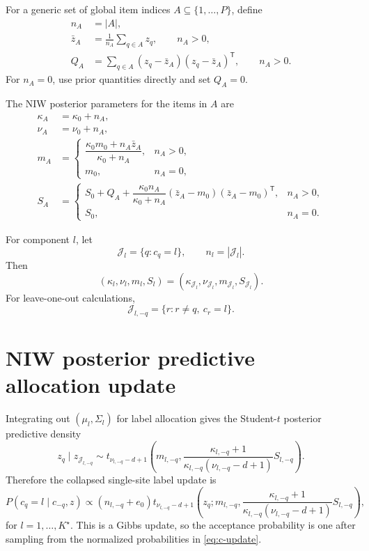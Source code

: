 \documentclass[11pt]{article}
\newcommand{\trans}{^{\mathsf T}}
\begin{document}
For a generic set of global item indices $A\subseteq\{1,\dots,P\}$, define
\begin{align}
    n_A &= |A|,\\
    \bar z_A &= \frac{1}{n_A}\sum_{q\in A}z_q,
    \qquad n_A>0,\\
    Q_A &= \sum_{q\in A}(z_q-\bar z_A)(z_q-\bar z_A)\trans,
    \qquad n_A>0.
\end{align}
For $n_A=0$, use prior quantities directly and set $Q_A=0$.

The NIW posterior parameters for the items in $A$ are
\begin{align}
    \kappa_A &= \kappa_0+n_A,\\
    \nu_A &= \nu_0+n_A,\\
    m_A &=
    \begin{cases}
    \dfrac{\kappa_0m_0+n_A\bar z_A}{\kappa_0+n_A}, & n_A>0,\\[1em]
    m_0, & n_A=0,
    \end{cases}\\
    S_A &=
    \begin{cases}
    S_0+Q_A+
    \dfrac{\kappa_0 n_A}{\kappa_0+n_A}
    (\bar z_A-m_0)(\bar z_A-m_0)\trans,
    & n_A>0,\\[1em]
    S_0, & n_A=0.
    \end{cases}
    \label{eq:niw-posterior-params}
\end{align}

For component $l$, let
\[
    \mathcal J_l=\{q:c_q=l\},
    \qquad n_l=|\mathcal J_l|.
\]
Then
\[
    (\kappa_l,\nu_l,m_l,S_l)
    =
    (\kappa_{\mathcal J_l},\nu_{\mathcal J_l},m_{\mathcal J_l},S_{\mathcal J_l}).
\]
For leave-one-out calculations,
\[
    \mathcal J_{l,-q}=\{r:r\neq q,\ c_r=l\}.
\]

\section{NIW posterior predictive allocation update}

Integrating out $(\mu_l,\Sigma_l)$ for label allocation gives the Student-$t$
posterior predictive density
\begin{equation}
    z_q\mid z_{\mathcal J_{l,-q}}
    \sim
    t_{\nu_{l,-q}-d+1}
    \left(
    m_{l,-q},
    \frac{\kappa_{l,-q}+1}
    {\kappa_{l,-q}(\nu_{l,-q}-d+1)}S_{l,-q}
    \right).
    \label{eq:niw-predictive}
\end{equation}
Therefore the collapsed single-site label update is
\begin{equation}
    P(c_q=l\mid c_{-q},z)
    \propto
    (n_{l,-q}+e_0)
    t_{\nu_{l,-q}-d+1}
    \left(
    z_q;
    m_{l,-q},
    \frac{\kappa_{l,-q}+1}
    {\kappa_{l,-q}(\nu_{l,-q}-d+1)}S_{l,-q}
    \right),
    \label{eq:c-update}
\end{equation}
for $l=1,\dots,K^\star$.  This is a Gibbs update, so the acceptance
probability is one after sampling from the normalized probabilities in
\eqref{eq:c-update}.
\end{document}
